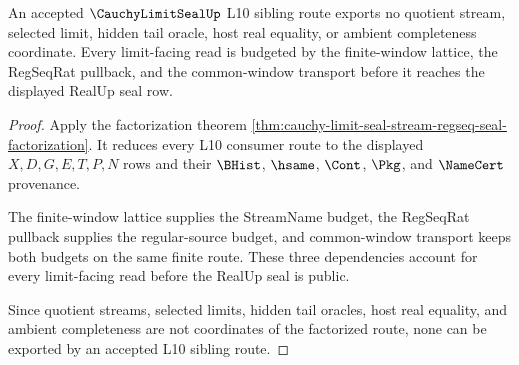 \begin{theorem}
\label{thm:cauchy-limit-seal-no-unbudgeted-limit}
An accepted $\CauchyLimitSealUp$ L10 sibling route exports no quotient stream, selected limit, hidden tail oracle, host real equality, or ambient completeness coordinate. Every limit-facing read is budgeted by the finite-window lattice, the RegSeqRat pullback, and the common-window transport before it reaches the displayed RealUp seal row.
\end{theorem}
\begin{proof}
Apply the factorization theorem \autoref{thm:cauchy-limit-seal-stream-regseq-seal-factorization}. It reduces every L10 consumer route to the displayed $X,D,G,E,T,P,N$ rows and their $\BHist$, $\hsame$, $\Cont$, $\Pkg$, and $\NameCert$ provenance.

The finite-window lattice supplies the StreamName budget, the RegSeqRat pullback supplies the regular-source budget, and common-window transport keeps both budgets on the same finite route. These three dependencies account for every limit-facing read before the RealUp seal is public.

Since quotient streams, selected limits, hidden tail oracles, host real equality, and ambient completeness are not coordinates of the factorized route, none can be exported by an accepted L10 sibling route.
\end{proof}

